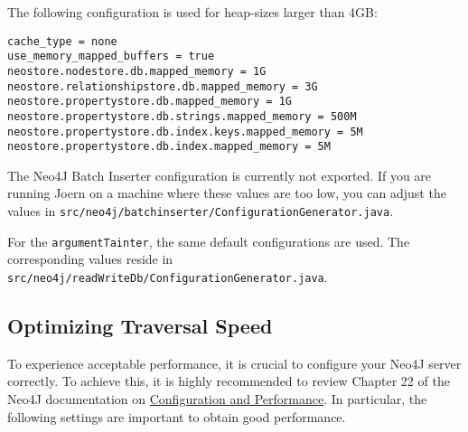 \documentclass[a4paper]{article}
\newcommand{\code}[1]{\texttt{\small #1}}
\begin{document}
The following configuration is used for heap-sizes larger than 4GB:

\begin{verbatim}
cache_type = none
use_memory_mapped_buffers = true
neostore.nodestore.db.mapped_memory = 1G
neostore.relationshipstore.db.mapped_memory = 3G
neostore.propertystore.db.mapped_memory = 1G
neostore.propertystore.db.strings.mapped_memory = 500M
neostore.propertystore.db.index.keys.mapped_memory = 5M
neostore.propertystore.db.index.mapped_memory = 5M
\end{verbatim}

The Neo4J Batch Inserter configuration is currently not
exported. If you are running Joern on a machine where these values
are too low, you can adjust the values in
\code{src/neo4j/batchinserter/ConfigurationGenerator.java}.

For the \code{argumentTainter}, the same default configurations are
used. The corresponding values reside in
\code{src/neo4j/readWriteDb/ConfigurationGenerator.java}.

\subsection{Optimizing Traversal Speed}

To experience acceptable performance, it is crucial to configure your
Neo4J server correctly. To achieve this, it is highly recommended to
review Chapter 22 of the Neo4J documentation on
\href{http://docs.neo4j.org/chunked/stable/embedded-configuration.html}{Configuration
  and Performance}. In particular, the following settings are
important to obtain good performance.
\end{document}
